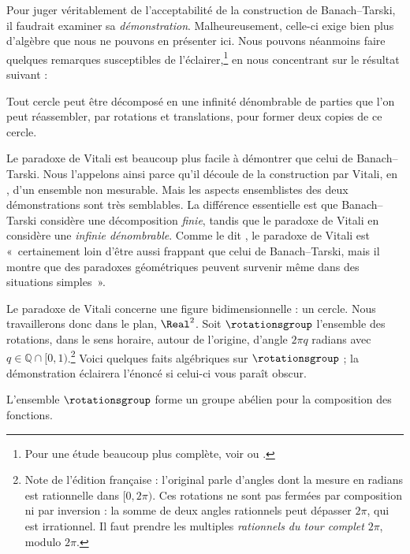 \documentclass[../../../include/open-logic-section]{subfiles}
\begin{document}

Pour juger véritablement de l'acceptabilité
de la construction de Banach--Tarski,
il faudrait examiner sa \emph{démonstration}.
Malheureusement, celle-ci exige bien plus
d'algèbre que nous ne pouvons en présenter
ici. Nous pouvons néanmoins faire quelques
remarques susceptibles de l'éclairer,\footnote{
Pour une étude beaucoup plus complète,
voir \cite{Weston2003} ou \cite{Wagon2016}.}
en nous concentrant sur le résultat suivant :

\begin{thm}
Tout cercle peut être décomposé en une
infinité dénombrable de parties que l'on
peut réassembler, par rotations et
translations, pour former deux copies
de ce cercle.
\end{thm}

Le paradoxe de Vitali est beaucoup plus
facile à démontrer que celui de
Banach--Tarski. Nous l'appelons ainsi
parce qu'il découle de la construction
par Vitali, en \citeyear{Vitali1905},
d'un ensemble non mesurable. Mais les
aspects ensemblistes des deux démonstrations
sont très semblables. La différence
essentielle est que Banach--Tarski
considère une décomposition \emph{finie},
tandis que le paradoxe de Vitali en
considère une \emph{infinie dénombrable}.
Comme le dit \citet{Weston2003},
le paradoxe de Vitali est «~certainement
loin d'être aussi frappant que celui
de Banach--Tarski, mais il montre que
des paradoxes géométriques peuvent
survenir même dans des situations
simples~».

Le paradoxe de Vitali concerne une
figure bidimensionnelle : un cercle.
Nous travaillerons donc dans le plan,
$\Real^2$. Soit $\rotationsgroup$
l'ensemble des rotations, dans le sens
horaire, autour de l'origine, d'angle
$2\pi q$ radians avec
$q\in\mathbb{Q}\cap[0,1)$.\footnote{
Note de l'édition française : l'original
parle d'angles dont la mesure en radians
est rationnelle dans $[0,2\pi)$.
Ces rotations ne sont pas fermées
par composition ni par inversion :
la somme de deux angles rationnels
peut dépasser $2\pi$, qui est
irrationnel. Il faut prendre les
multiples \emph{rationnels du tour
complet} $2\pi$, modulo $2\pi$.}
Voici quelques faits algébriques
sur $\rotationsgroup$ ; la démonstration
éclairera l'énoncé si celui-ci
vous paraît obscur.

\begin{lem}
L'ensemble $\rotationsgroup$ forme
un {groupe} abélien pour la
composition des fonctions.
\end{lem}
\end{document}
